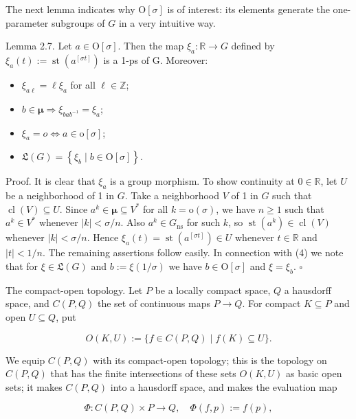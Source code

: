 \documentclass[10pt]{article}
\begin{document}
The next lemma indicates why $\mathrm{O}[\sigma]$ is of interest: its elements generate the one-parameter subgroups of $G$ in a very intuitive way.

Lemma 2.7. Let $a \in \mathrm{O}[\sigma]$. Then the map $\xi_{a}: \mathbb{R} \rightarrow G$ defined by $\xi_{a}(t):=\operatorname{st}\left(a^{[\sigma t]}\right)$ is a 1-ps of G. Moreover:

\begin{itemize}
  \item[(1)] $\xi_{a \ell}=\ell \xi_{a}$ for all $\ell \in \mathbb{Z}$;
  \item[(2)] $b \in \boldsymbol{\mu} \Longrightarrow \xi_{b a b^{-1}}=\xi_{a}$;
  \item[(3)] $\xi_{a}=o \Longleftrightarrow a \in \mathrm{o}[\sigma]$;
  \item[(4)] $\mathfrak{L}(G)=\left\{\xi_{b} \mid b \in \mathrm{O}[\sigma]\right\}$.
\end{itemize}

Proof. It is clear that $\xi_{a}$ is a group morphism. To show continuity at $0 \in \mathbb{R}$, let $U$ be a neighborhood of 1 in $G$. Take a neighborhood $V$ of 1 in $G$ such that $\operatorname{cl}(V) \subseteq U$. Since $a^{k} \in \boldsymbol{\mu} \subseteq V^{*}$ for all $k=\mathrm{o}(\sigma)$, we have $n \geq 1$ such that $a^{k} \in V^{*}$ whenever $|k|<\sigma / n$. Also $a^{k} \in G_{\mathrm{ns}}$ for such $k$, so $\operatorname{st}\left(a^{k}\right) \in \operatorname{cl}(V)$ whenever $|k|<\sigma / n$. Hence $\xi_{a}(t)=\operatorname{st}\left(a^{[\sigma t]}\right) \in U$ whenever $t \in \mathbb{R}$ and $|t|<1 / n$. The remaining assertions follow easily. In connection with (4) we note that for $\xi \in \mathfrak{L}(G)$ and $b:=\xi(1 / \sigma)$ we have $b \in \mathrm{O}[\sigma]$ and $\xi=\xi_{b}$. \(\square\)

The compact-open topology. Let $P$ be a locally compact space, $Q$ a hausdorff space, and $C(P, Q)$ the set of continuous maps $P \rightarrow Q$. For compact $K \subseteq P$ and open $U \subseteq Q$, put

$$
O(K, U):=\{f \in C(P, Q) \mid f(K) \subseteq U\} .
$$

We equip $C(P, Q)$ with its compact-open topology; this is the topology on $C(P, Q)$ that has the finite intersections of these sets $O(K, U)$ as basic open sets; it makes $C(P, Q)$ into a hausdorff space, and makes the evaluation map

$$
\Phi: C(P, Q) \times P \rightarrow Q, \quad \Phi(f, p):=f(p),
$$
\end{document}

